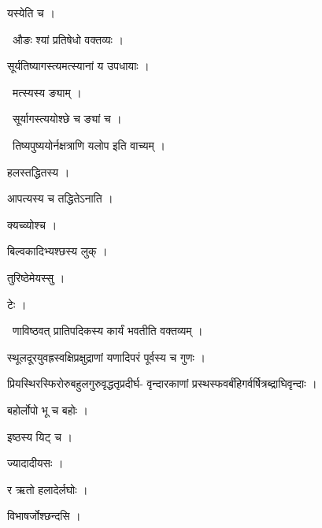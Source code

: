 \documentclass[10pt, openany, oneside]{book}
\begin{document}
\noindent यस्येति च ।

\par\noindent\hspace{1.5em}{\vps वा॰}~{\qt औङः श्यां प्रतिषेधो वक्तव्यः ।}

\noindent सूर्यतिष्यागस्त्यमत्स्यानां य उपधायाः ।

\par\noindent\hspace{1.5em}{\vps वा॰}~{\qt मत्स्यस्य ङ्याम् ।}

\par\noindent\hspace{1.5em}{\vps वा॰}~{\qt सूर्यागस्त्ययोश्छे च ङ्यां च ।}

\par\noindent\hspace{1.5em}{\vps वा॰}~{\qt तिष्यपुष्ययोर्नक्षत्राणि यलोप इति वाच्यम् ।}

\noindent हलस्तद्धितस्य ।

\noindent आपत्यस्य च तद्धितेऽनाति ।

\noindent क्यच्व्योश्च ।

\noindent बिल्वकादिभ्यश्छस्य लुक् ।

\noindent तुरिष्ठेमेयस्सु ।

\noindent टेः ।

\par\noindent\hspace{1.5em}{\vps वा॰}~{\qt णाविष्ठवत् प्रातिपदिकस्य कार्यं भवतीति वक्तव्यम् ।}

\noindent स्थूलदूरयुवह्रस्वक्षिप्रक्षुद्राणां यणादिपरं पूर्वस्य च गुणः ।

\noindent प्रियस्थिरस्फिरोरुबहुलगुरुवृद्धतृप्रदीर्घ- वृन्दारकाणां प्रस्थस्फवर्बंहिगर्वर्षित्रब्द्राघिवृन्दाः ।

\noindent बहोर्लोपो भू च बहोः ।

\noindent इष्ठस्य यिट् च ।

\noindent ज्यादादीयसः ।

\noindent र ऋतो हलादेर्लघोः ।

\noindent विभाषर्जोश्छन्दसि ।
\end{document}
